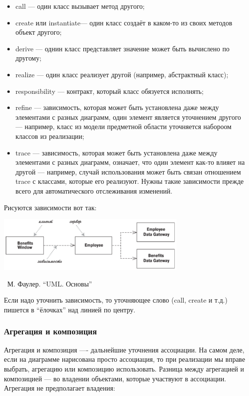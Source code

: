 \documentclass[a5paper]{article}
\newcommand{\attribution}[1] {
	\vspace{-5mm}\begin{flushright}\begin{scriptsize}%
	{\textcopyright\, #1}\end{scriptsize}\end{flushright}
}
\begin{document}
\begin{itemize}
	\item call --- один класс вызывает метод другого;
	\item create или instantiate--- один класс создаёт в каком-то из своих методов объект другого;
	\item derive --- однин класс представляет значение может быть вычислено по другому;
	\item realize --- один класс реализует другой (например, абстрактный класс);
	\item responsibility --- контракт, который класс обязуется исполнять;
	\item refine --- зависимость, которая может быть установлена даже между элементами с разных диаграмм, один элемент является уточнением другого --- например, класс из модели предметной области уточняется набороом классов из реализации;
	\item trace --- зависимость, которая может быть установлена даже между элементами с разных диаграмм, означает, что один элемент как-то влияет на другой --- например, случай использования может быть связан отношением trace с классами, которые его реализуют. Нужны такие зависимости прежде всего для автоматического отслеживания изменений.
\end{itemize}

Рисуются зависимости вот так:

\begin{center}
	\includegraphics[width=0.7\textwidth]{dependencies.png}
	\attribution{М. Фаулер. ``UML. Основы''}
\end{center}

Если надо уточнить зависимость, то уточняющее слово (call, create и т.д.) пишется в ``ёлочках'' над линией по центру.

\subsubsection{Агрегация и композиция}

Агрегация и композиция ---- дальнейшие уточнения ассоциации. На самом деле, если на диаграмме нарисована просто ассоциация, то при реализации мы вправе выбрать, агрегацию или композицию использовать. Разница между агрегацией и композицией --- во владении объектами, которые участвуют в ассоциации. Агрегация не предполагает владения:
\end{document}
